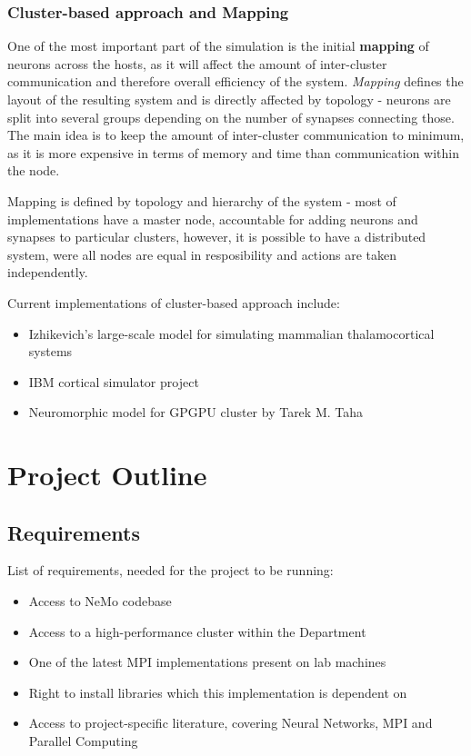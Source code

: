 \documentclass[12pt]{report}
\begin{document}
\subsection{Cluster-based approach and Mapping}

One of the most important part of the simulation is the initial \textbf{mapping} of neurons across the hosts, as it will affect the amount of inter-cluster communication and therefore overall efficiency
of the system. \emph{Mapping} defines the layout of the resulting system and is directly affected by topology - neurons are split into several groups depending on the number of synapses connecting those.
The main idea is to keep the amount of inter-cluster communication to minimum, as it is more expensive in terms of memory and time than communication within the node.

Mapping is defined by topology and hierarchy of the system - most of implementations have a master node, accountable for adding neurons and synapses to particular clusters, however, it is
possible to have a distributed system, were all nodes are equal in resposibility and actions are taken independently.

Current implementations of cluster-based approach include:

\begin{itemize}
\item{Izhikevich's large-scale model for simulating mammalian thalamocortical systems \cite{EugeneM.Izhikevich2008}}
\item{IBM cortical simulator project\cite{DharmendraS.Modha2007}}
\item{Neuromorphic model for GPGPU cluster by Tarek M. Taha\cite{TarekM.Taha2010}}
\end{itemize}

\chapter{Project Outline}

\section{Requirements}

List of requirements, needed for the project to be running:

\begin{itemize}
\item{Access to NeMo codebase}
\item{Access to a high-performance cluster within the Department}
\item{One of the latest MPI implementations present on lab machines}
\item{Right to install libraries which this implementation is dependent on}
\item{Access to project-specific literature, covering Neural Networks, MPI and Parallel Computing}
\end{itemize}
\end{document}

